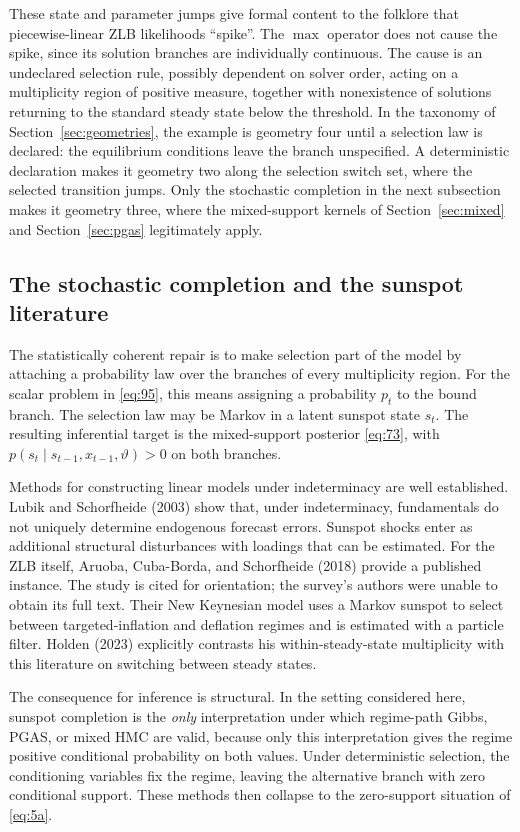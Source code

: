 \documentclass[11pt]{article}
\begin{document}
These state and parameter jumps give formal content to the folklore that piecewise-linear ZLB likelihoods ``spike''. The $\max$ operator does not cause the spike, since its solution branches are individually continuous. The cause is an undeclared selection rule, possibly dependent on solver order, acting on a multiplicity region of positive measure, together with nonexistence of solutions returning to the standard steady state below the threshold. In the taxonomy of Section~\ref{sec:geometries}, the example is geometry four until a selection law is declared: the equilibrium conditions leave the branch unspecified. A deterministic declaration makes it geometry two along the selection switch set, where the selected transition jumps. Only the stochastic completion in the next subsection makes it geometry three, where the mixed-support kernels of Section~\ref{sec:mixed} and Section~\ref{sec:pgas} legitimately apply.

\subsection{The stochastic completion and the sunspot literature}
\label{sec:nk-sunspot}

The statistically coherent repair is to make selection part of the model by attaching a probability law over the branches of every multiplicity region. For the scalar problem in \eqref{eq:95}, this means assigning a probability $p_t$ to the bound branch. The selection law may be Markov in a latent sunspot state $s_t$. The resulting inferential target is the mixed-support posterior \eqref{eq:73}, with $p(s_t\mid s_{t-1},x_{t-1},\vartheta)>0$ on both branches.

Methods for constructing linear models under indeterminacy are well established. Lubik and Schorfheide (2003) show that, under indeterminacy, fundamentals do not uniquely determine endogenous forecast errors. Sunspot shocks enter as additional structural disturbances with loadings that can be estimated. For the ZLB itself, Aruoba, Cuba-Borda, and Schorfheide (2018) provide a published instance. The study is cited for orientation; the survey's authors were unable to obtain its full text. Their New Keynesian model uses a Markov sunspot to select between targeted-inflation and deflation regimes and is estimated with a particle filter. Holden (2023) explicitly contrasts his within-steady-state multiplicity with this literature on switching between steady states.

The consequence for inference is structural. In the setting considered here, sunspot completion is the \emph{only} interpretation under which regime-path Gibbs, PGAS, or mixed HMC are valid, because only this interpretation gives the regime positive conditional probability on both values. Under deterministic selection, the conditioning variables fix the regime, leaving the alternative branch with zero conditional support. These methods then collapse to the zero-support situation of \eqref{eq:5a}.
\end{document}
